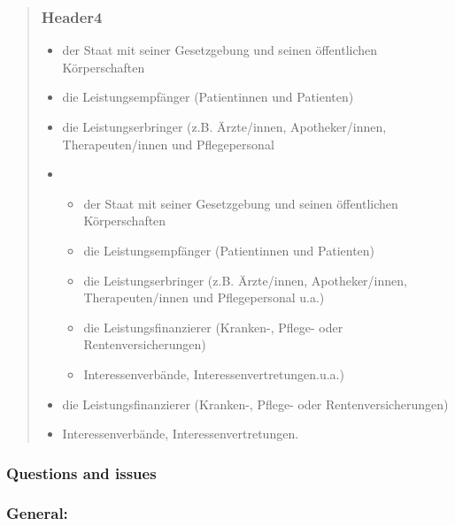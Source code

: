 \documentclass{article}
\begin{document}
\begin{quote}
\subsubsection{Header4}\label{H5874541}


\begin{itemize}
\item der Staat mit seiner Gesetzgebung und seinen öffentlichen Körperschaften


\item die Leistungsempfänger (Patientinnen und Patienten)


\item die Leistungserbringer (z.B. Ärzte/innen, Apotheker/innen, Therapeuten/innen und Pflegepersonal 


\item 
\begin{itemize}
\item der Staat mit seiner Gesetzgebung und seinen öffentlichen Körperschaften


\item die Leistungsempfänger (Patientinnen und Patienten)


\item die Leistungserbringer (z.B. Ärzte/innen, Apotheker/innen, Therapeuten/innen und Pflegepersonal u.a.)


\item die Leistungsfinanzierer (Kranken-, Pflege- oder Rentenversicherungen)


\item Interessenverbände, Interessenvertretungen.u.a.)


\end{itemize}

\item die Leistungsfinanzierer (Kranken-, Pflege- oder Rentenversicherungen)


\item Interessenverbände, Interessenvertretungen.


\end{itemize}

\end{quote}


\subsubsection{\textbf{Questions and issues}}\label{H6787224}



\subsubsection{\textbf{General:}}\label{H337015}
\end{document}

